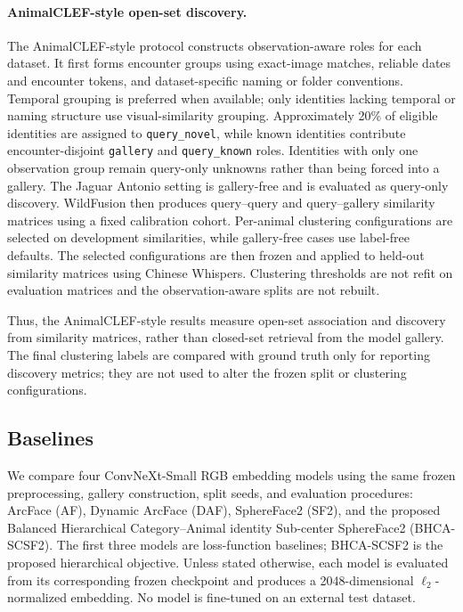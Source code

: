 \paragraph{AnimalCLEF-style open-set discovery.}
The AnimalCLEF-style protocol constructs observation-aware roles for each
dataset. It first forms encounter
groups using exact-image matches, reliable dates and encounter tokens, and
dataset-specific naming or folder conventions. Temporal grouping is preferred
when available; only identities lacking temporal or naming structure use
visual-similarity grouping. Approximately 20\% of eligible identities are
assigned to \texttt{query\_novel}, while known identities contribute
encounter-disjoint \texttt{gallery} and \texttt{query\_known} roles. Identities
with only one observation group remain query-only unknowns rather than being
forced into a gallery. The Jaguar Antonio setting is gallery-free and is
evaluated as query-only discovery. WildFusion then produces query--query and
query--gallery similarity matrices using a fixed calibration cohort.
Per-animal clustering configurations are selected on development
similarities, while gallery-free cases use label-free defaults. The selected
configurations are then frozen and applied to held-out similarity matrices
using Chinese Whispers. Clustering thresholds are not refit on evaluation
matrices and the observation-aware splits are not rebuilt.

Thus, the AnimalCLEF-style results measure open-set association and
discovery from similarity matrices, rather than closed-set retrieval from the
model gallery. The final clustering labels are compared with ground truth
only for reporting discovery metrics; they are not used to alter the frozen
split or clustering configurations.

\subsection{Baselines}
\label{sec:experiments:baselines}

We compare four ConvNeXt-Small RGB embedding models using the same frozen
preprocessing, gallery construction, split seeds, and evaluation procedures:
ArcFace (AF), Dynamic ArcFace (DAF), SphereFace2 (SF2), and the proposed
Balanced Hierarchical Category--Animal identity Sub-center SphereFace2
(BHCA-SCSF2). The first three models are loss-function baselines; BHCA-SCSF2
is the proposed hierarchical objective. Unless stated otherwise, each model
is evaluated from its corresponding frozen checkpoint and produces a
2048-dimensional $\ell_2$-normalized embedding. No model is fine-tuned on an
external test dataset.

